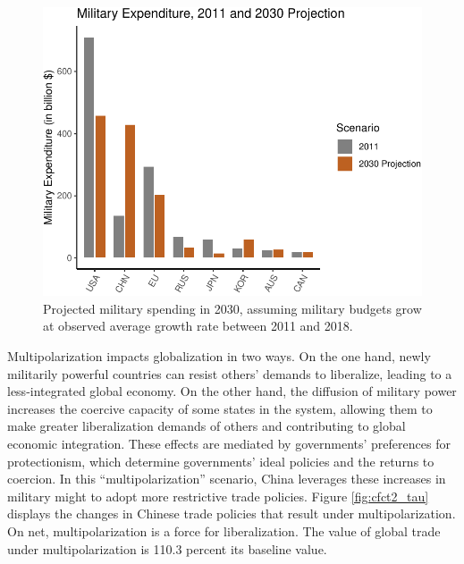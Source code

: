 \documentclass{puthesis}
\begin{document}
\begin{figure}
\centering
\includegraphics{figure/milex_2030-1.pdf}
\caption{Projected military spending in 2030, assuming military budgets
grow at observed average growth rate between 2011 and 2018.
\label{fig:milex_2030}}
\end{figure}

Multipolarization impacts globalization in two ways. On the one hand,
newly militarily powerful countries can resist others' demands to
liberalize, leading to a less-integrated global economy. On the other
hand, the diffusion of military power increases the coercive capacity of
some states in the system, allowing them to make greater liberalization
demands of others and contributing to global economic integration. These
effects are mediated by governments' preferences for protectionism,
which determine governments' ideal policies and the returns to coercion.
In this ``multipolarization'' scenario, China leverages these increases
in military might to adopt more restrictive trade policies. Figure
\ref{fig:cfct2_tau} displays the changes in Chinese trade policies that
result under multipolarization. On net, multipolarization is a force for
liberalization. The value of global trade under multipolarization is
110.3 percent its baseline value.
\end{document}
